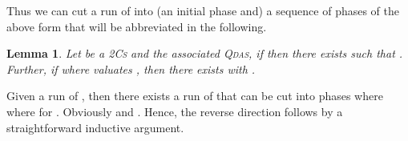 \documentclass[runningheads,oribibl,]{article}
\newcommand{\qdas}{\textsc{Qdas}\xspace}
\newcommand{\twocs}{2\textsc{Cs}\xspace}
\newtheorem{lemma}{Lemma}{}
\newenvironment{proof}{\noindent{\it Proof.\hspace*{.5cm}}}{}
\begin{document}
Thus we can cut a run of  into (an initial phase and) a sequence of
phases of the above form that will be abbreviated  in the
following.


\begin{lemma}
  Let  be a \twocs and 
  the associated \qdas, if   then there exists
   such
  that . Further, if 
  where  valuates ,
  then there exists  with .
\end{lemma}

\begin{proof}

  Given a run  of
  , then there exists a run of  that can be cut into
  phases  where  where
   for .
    Obviously  and
  .
  Hence, the reverse direction follows by a straightforward inductive
  argument.
      \end{proof}
\end{document}
